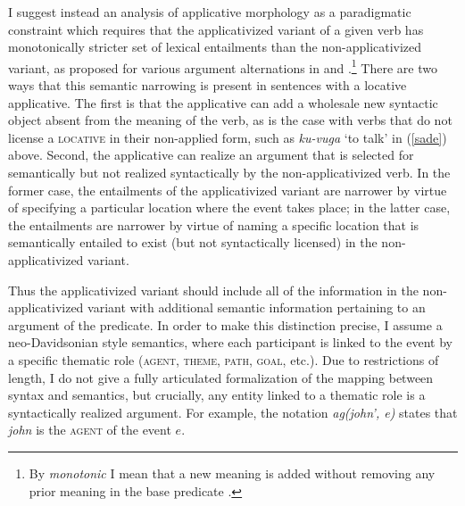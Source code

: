 \documentclass[output=paper]{langsci/langscibook}
\begin{document}
I suggest instead an analysis of applicative morphology as a paradigmatic constraint which requires that the applicativized variant of a given verb has monotonically stricter set of lexical entailments than the non-applicativized variant, as proposed for various argument alternations in \citet{ackermanmoore:2001} and \citet{beavers:2010b}.\footnote{By \emph{monotonic} I mean that a new meaning is added without removing any prior meaning in the base predicate \citep{akg:2007, akg:2012}.} There are two ways that this semantic narrowing is present in sentences with a locative applicative. The first is that the applicative can add a wholesale new syntactic object absent from the meaning of the verb, as is the case with verbs that do not license a {\scshape locative} in their non-applied form, such as \emph{ku-vuga} `to talk'  in (\ref{sade}) above. Second, the applicative can realize an argument that is selected for semantically but not realized syntactically by the non-applicativized verb. In the former case, the entailments of the applicativized variant are narrower by virtue of specifying a particular location where the event takes place; in the latter case, the entailments are narrower by virtue of naming a specific location that is semantically entailed to exist (but not syntactically licensed) in the non-applicativized variant. 
 
 Thus the applicativized variant should include all of the information in the non-appli\-ca\-tivized variant with additional semantic information pertaining to an argument of the predicate. In order to make this distinction precise, I assume a neo-Davidsonian style semantics, where each participant is linked to the event by a specific thematic role ({\scshape agent, theme, path, goal,} etc.). Due to restrictions of length, I do not give a fully articulated formalization of the mapping between syntax and semantics, but crucially, any entity linked to a thematic role is a syntactically realized argument. For example, the notation \emph{ag(john', e)} states that  \emph{john} is the {\scshape agent} of the event $e$.
	 
\end{document}
